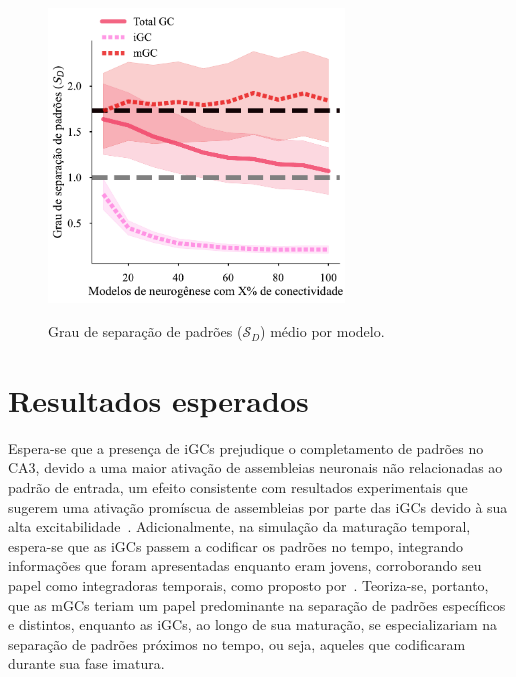 \begin{figure}
    \centering
    \caption{Grau de separação de padrões ($\mathcal{S}_D$) médio por modelo.}
    \includegraphics[width=0.7\textwidth]{figuras/plots/avg_pattern_separation}
    \label{fig:avg_pattern_separation}
\end{figure}


\section{Resultados esperados}

Espera-se que a presença de iGCs prejudique o completamento de padrões no CA3, devido a uma maior ativação de assembleias
neuronais não relacionadas ao padrão de entrada, um efeito consistente com resultados experimentais que sugerem uma ativação
promíscua de assembleias por parte das iGCs devido à sua alta excitabilidade~\cite{koSystems2025}. Adicionalmente, na simulação da
maturação temporal, espera-se que as iGCs passem a codificar os padrões no tempo, integrando informações que foram apresentadas
enquanto eram jovens, corroborando seu papel como integradoras temporais, como proposto por~\cite{aimoneComputational2009}.
Teoriza-se, portanto, que as mGCs teriam um papel predominante na separação de padrões específicos e distintos, enquanto as iGCs,
ao longo de sua maturação, se especializariam na separação de padrões próximos no tempo, ou seja, aqueles que codificaram durante
sua fase imatura.
